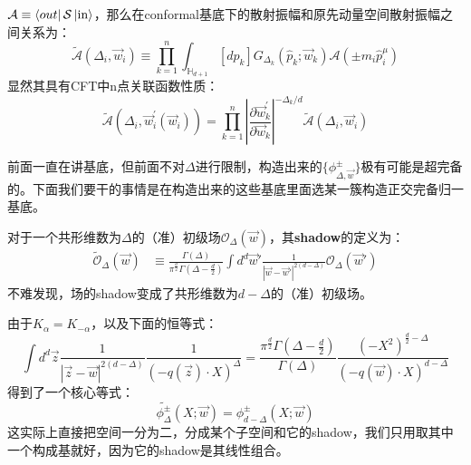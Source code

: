 $\mathcal{A}\equiv\bra{out}\mathcal{S}\ket{\text{in}}$，那么在conformal基底下的散射振幅和原先动量空间散射振幅之间关系为：
\begin{equation}
	\widetilde{\mathcal{A}}(\Delta_i,\vec{w}_i)\equiv\prod_{k=1}^n\int_{\mathbb{H}_{d+1}}[d\hat{p}_k]G_{\Delta_k}(\hat{p}_k;\vec{w}_k)\mathcal{A}(\pm m_i\hat{p}_i^\mu)
\end{equation}
显然其具有CFT中n点关联函数性质：
\begin{equation}
	\widetilde{\mathcal A}(\Delta_{i},\vec{w}_{i}^{\prime}(\vec{w}_{i}))=\prod_{k=1}^{n}\left|\frac{\partial\vec{w}_{k}^{\prime}}{\partial\vec{w}_{k}}\right|^{-\Delta_{k}/d}\widetilde{\mathcal A}(\Delta_{i},\vec{w}_{i})
\end{equation}

前面一直在讲基底，但前面不对$\Delta$进行限制，构造出来的$\{\phi^{\pm}_{\Delta,\vec{w}}\}$极有可能是超完备的。下面我们要干的事情是在构造出来的这些基底里面选某一簇构造正交完备归一基底。

\begin{definition}
	对于一个共形维数为$\Delta$的（准）初级场$\mathcal{O}_\Delta(\vec{w})$，其\textbf{shadow}的定义为\cite{Ferrara:1972xe,Ferrara:1972ay,Ferrara:1972uq,Ferrara:1972kab,Costa:2014rya}：
	\begin{equation}
		\begin{aligned}\widetilde{\mathcal{O}}_\Delta(\vec{w})&\equiv\frac{\Gamma(\Delta)}{\pi^{\frac{d}{2}}\Gamma(\Delta-\frac{d}{2})}\int d^d\vec{w}'\frac{1}{|\vec{w}-\vec{w}'|^{2(d-\Delta)}}\mathcal{O}_\Delta(\vec{w}')\end{aligned}
	\end{equation}
	不难发现，场的shadow变成了共形维数为$d-\Delta$的（准）初级场。
\end{definition}
由于$K_\alpha=K_{-\alpha}$，以及下面的恒等式\cite{Simmons-Duffin:2012juh}：
\begin{equation}
	\int d^{d}\vec{z}\frac{1}{|\vec{z}-\vec{w}|^{2(d-\Delta)}}\frac{1}{(-q(\vec{z})\cdot X)^{\Delta}}=\frac{\pi^{\frac{d}{2}}\Gamma(\Delta-\frac{d}{2})}{\Gamma(\Delta)}\frac{(-X^{2})^{\frac{d}{2}-\Delta}}{(-q(\vec{w})\cdot X)^{d-\Delta}}
\end{equation}
得到了一个核心等式：
\begin{equation}\label{eq:27.17}
	\boxed{\widetilde{\phi_\Delta^\pm}(X;\vec{w})=\phi_{d-\Delta}^\pm(X;\vec{w})}
\end{equation}
这实际上直接把空间一分为二，分成某个子空间和它的shadow，我们只用取其中一个构成基就好，因为它的shadow是其线性组合。

